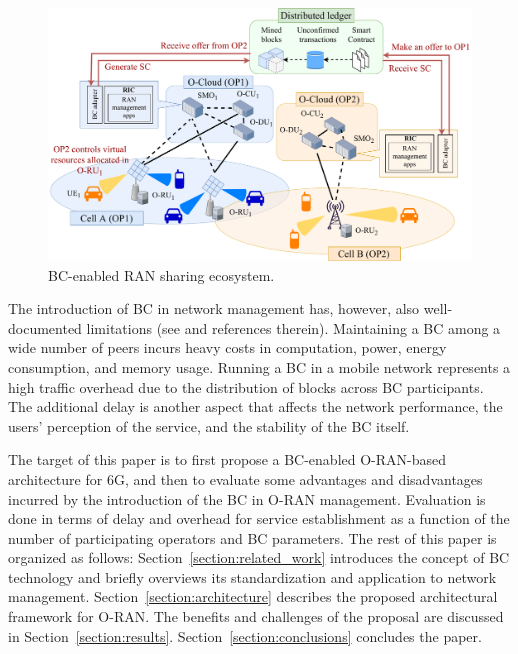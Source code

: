 \documentclass[journal]{IEEEtran}
\begin{document}
\begin{figure}[ht!]
\includegraphics[width=\linewidth]{blockchain_ran-ecosystem}
\caption{BC-enabled RAN sharing ecosystem.}
\label{fig:blockchain_ecosystem}
\end{figure} 

The introduction of BC in network management has, however, also well-documented limitations (see \cite{FWilhelmi_PIMRC} and references therein). Maintaining a BC among a wide number of peers incurs heavy costs in computation, power, energy consumption, and memory usage. Running a BC in a mobile network represents a high traffic overhead due to the distribution of blocks across BC participants. The additional delay is another aspect that affects the network performance, the users' perception of the service, and the stability of the BC itself.%

The target of this paper is to first propose a BC-enabled O-RAN-based architecture for 6G, and then to evaluate some advantages and disadvantages incurred by the introduction of the BC in O-RAN management. Evaluation is done in terms of delay and overhead for service establishment as a function of the number of participating operators and BC parameters. The rest of this paper is organized as follows: Section~\ref{section:related_work} introduces the concept of BC technology and briefly overviews its standardization and application to network management. Section~\ref{section:architecture} describes the proposed architectural framework for O-RAN. The benefits and challenges of the proposal are discussed in Section~\ref{section:results}. Section~\ref{section:conclusions} concludes the paper.

\end{document}
